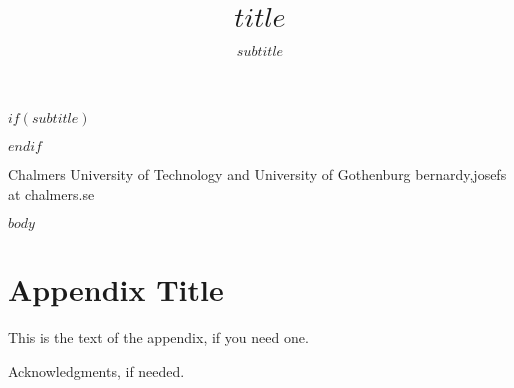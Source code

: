 \documentclass[preprint]{PaperTools/latex/sigplanconf}
\begin{document}
\setlength{\pdfpageheight}{\paperheight}
\setlength{\pdfpagewidth}{\paperwidth}






\title{$title$}
$if(subtitle)$
\subtitle{$subtitle$}
$endif$

           {Chalmers University of Technology and University of Gothenburg}
           {bernardy,josefs at chalmers.se}

\maketitle


$body$

\appendix
\section{Appendix Title}

This is the text of the appendix, if you need one.

\acks

Acknowledgments, if needed.






\end{document}
